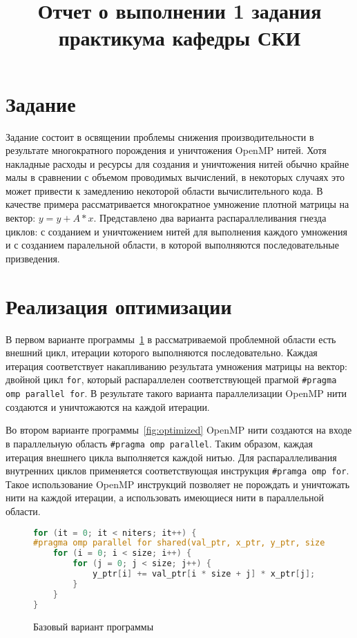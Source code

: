\documentclass[12pt, oneside, a4paper]{article}
\begin{document}
\title{Отчет о выполнении 1 задания практикума кафедры СКИ}

\section{Задание}

Задание состоит в освящении проблемы снижения производительности в результате многократного порождения и уничтожения OpenMP нитей. Хотя накладные расходы и ресурсы для создания и уничтожения нитей обычно крайне малы в сравнении с объемом проводимых вычислений, в некоторых случаях это может привести к замедлению некоторой области вычислительного кода. В качестве примера рассматривается многократное умножение плотной матрицы на вектор: $y = y + A * x$. Представлено два варианта распараллеливания гнезда циклов: с созданием и уничтожением нитей для выполнения каждого умножения и с созданием паралельной области, в которой выполняются последовательные призведения.

\section{Реализация оптимизации}

В первом варианте программы~\ref{fig:base} в рассматриваемой проблемной области есть внешний цикл, итерации которого выполняются последовательно. Каждая итерация соответствует накапливанию результата умножения матрицы на вектор: двойной цикл \texttt{for}, который распараллелен соответствующей прагмой \texttt{\#pragma omp parallel for}. В результате такого варианта параллелизации OpenMP нити создаются и уничтожаются на каждой итерации.

Во втором варианте программы~\ref{fig:optimized} OpenMP нити создаются на входе в параллельную область \texttt{\#pragma omp parallel}. Таким образом, каждая итерация внешнего цикла выполняется каждой нитью. Для распараллеливания внутренних циклов применяется соответствующая инструкция \texttt{\#pramga omp for}. Такое использование OpenMP инструкций позволяет не порождать и уничтожать нити на каждой итерации, а использовать имеющиеся нити в параллельной области.

\begin{figure}[h]
\begin{lstlisting}[language=C++]
for (it = 0; it < niters; it++) {
#pragma omp parallel for shared(val_ptr, x_ptr, y_ptr, size) private(i, j) schedule(static)
	for (i = 0; i < size; i++) {
		for (j = 0; j < size; j++) {
			y_ptr[i] += val_ptr[i * size + j] * x_ptr[j];
		}
	}
}
\end{lstlisting}
\caption{Базовый вариант программы}
\label{fig:base}
\end{figure}
\end{document}
